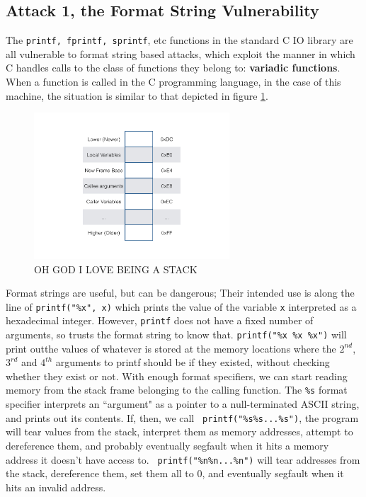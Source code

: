\subsection{Attack 1, the Format String Vulnerability}

The {\tt printf, fprintf, sprintf}, etc functions in the standard C IO library are all vulnerable to format string based
attacks, which exploit the manner in which C handles calls to the class of functions they belong to: \textbf{variadic
functions}\cite{vfunc}. When a function is called in the C programming language,
in the case of this machine, the situation is similar to that depicted in figure \ref{fig_stack}. 

\begin{figure}[ht] 
	\centering
    \includegraphics[width = 0.65\textwidth]{./images/stack.jpg}
    \caption{OH GOD I LOVE BEING A STACK}     
    \label{fig_stack}
\end{figure}

Format strings are useful, but can be dangerous; Their intended use is along the line of {\tt printf("\%x", x)} which
prints the value of the variable {\tt x} interpreted as a hexadecimal integer. However, {\tt printf} does not have a
fixed number of arguments, so trusts the format string to know that. {\tt printf("\%x \%x \%x")} will print outthe
values of whatever is stored at the memory locations where the $2^{nd}$, $3^{rd}$ and $4^{th}$ arguments to printf
should be if they existed, without checking whether they exist or not. With enough format specifiers, we can start
reading memory from the stack frame belonging to the calling function. The {\tt \%s} format specifier interprets an
``argument" as a pointer to a null-terminated ASCII string, and prints out its contents. If, then, we call {\tt
printf("\%s\%s...\%s")}, the program will tear values from the stack, interpret them as memory addresses, attempt to
dereference them, and probably eventually segfault when it hits a memory address it doesn't have access to. {\tt
printf("\%n\%n...\%n")} will tear addresses from the stack, dereference them, set them all to 0, and eventually segfault
when it hits an invalid address.

